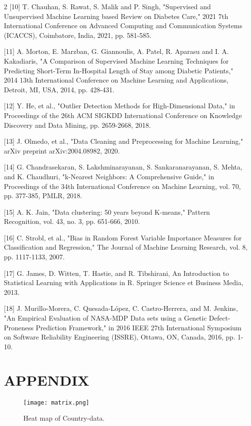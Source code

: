 \documentclass{article}
\begin{document}
\begin{multicols}{2}
[10] T. Chauhan, S. Rawat, S. Malik and P. Singh, "Supervised and Unsupervised Machine Learning based Review on Diabetes Care," 2021 7th International Conference on Advanced Computing and Communication Systems (ICACCS), Coimbatore, India, 2021, pp. 581-585. 

[11] A. Morton, E. Marzban, G. Giannoulis, A. Patel, R. Aparasu and I. A. Kakadiaris, "A Comparison of Supervised Machine Learning Techniques for Predicting Short-Term In-Hospital Length of Stay among Diabetic Patients," 2014 13th International Conference on Machine Learning and Applications, Detroit, MI, USA, 2014, pp. 428-431.

[12] Y. He, et al., "Outlier Detection Methods for High-Dimensional Data," in Proceedings of the 26th ACM SIGKDD International Conference on Knowledge Discovery and Data Mining, pp. 2659-2668, 2018.

[13] J. Olmedo, et al., "Data Cleaning and Preprocessing for Machine Learning," arXiv preprint arXiv:2004.08982, 2020.

[14] G. Chandrasekaran, S. Lakshminarayanan, S. Sankaranarayanan, S. Mehta, and K. Chaudhuri, "k-Nearest Neighbors: A Comprehensive Guide," in Proceedings of the 34th International Conference on Machine Learning, vol. 70, pp. 377-385, PMLR, 2018.

[15] A. K. Jain, "Data clustering: 50 years beyond K-means," Pattern Recognition, vol. 43, no. 3, pp. 651-666, 2010.

[16] C. Strobl, et al., "Bias in Random Forest Variable Importance Measures for Classification and Regression," The Journal of Machine Learning Research, vol. 8, pp. 1117-1133, 2007.

[17] G. James, D. Witten, T. Hastie, and R. Tibshirani, An Introduction to Statistical Learning with Applications in R. Springer Science et Business Media, 2013.

[18] J. Murillo-Morera, C. Quesada-López, C. Castro-Herrera, and M. Jenkins, "An Empirical Evaluation of NASA-MDP Data sets using a Genetic Defect-Proneness Prediction Framework," in 2016 IEEE 27th International Symposium on Software Reliability Engineering (ISSRE), Ottawa, ON, Canada, 2016, pp. 1-10.

\end{multicols}

\section{APPENDIX}
\begin{figure}[h] %
    \centering
    \texttt{[image: matrix.png]} %
    \caption{Heat map of Country-data.} %
    \label{fig:mi-imagen} %
\end{figure}
\end{document}
